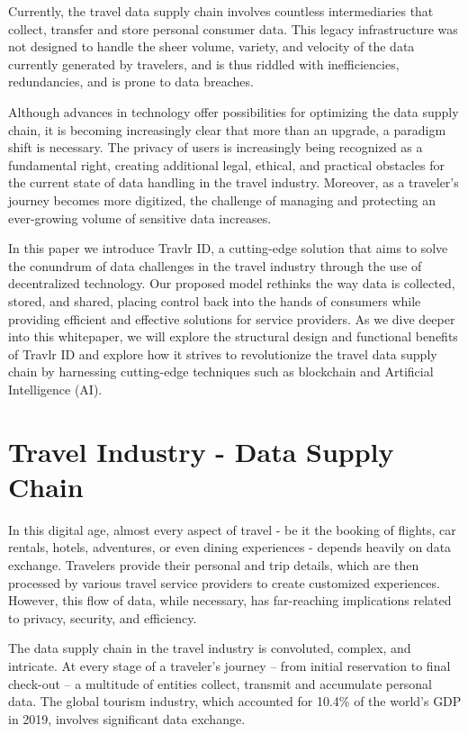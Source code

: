 \documentclass{article}
\begin{document}
Currently, the travel data supply chain involves countless intermediaries that collect, transfer and store personal consumer data. This legacy infrastructure was not designed to handle the sheer volume, variety, and velocity of the data currently generated by travelers, and is thus riddled with inefficiencies, redundancies, and is prone to data breaches.

Although advances in technology offer possibilities for optimizing the data supply chain, it is becoming increasingly clear that more than an upgrade, a paradigm shift is necessary. The privacy of users is increasingly being recognized as a fundamental right, creating additional legal, ethical, and practical obstacles for the current state of data handling in the travel industry. Moreover, as a traveler's journey becomes more digitized, the challenge of managing and protecting an ever-growing volume of sensitive data increases.

 In this paper we introduce Travlr ID, a cutting-edge solution that aims to solve the conundrum of data challenges in the travel industry through the use of decentralized technology. Our proposed model rethinks the way data is collected, stored, and shared, placing control back into the hands of consumers while providing efficient and effective solutions for service providers. As we dive deeper into this whitepaper, we will explore the structural design and functional benefits of Travlr ID and explore how it strives to revolutionize the travel data supply chain by harnessing cutting-edge techniques such as blockchain and Artificial Intelligence (AI).

\pagebreak

\section{Travel Industry - Data Supply Chain}

In this digital age, almost every aspect of travel - be it the booking of flights, car rentals, hotels, adventures, or even dining experiences - depends heavily on data exchange. Travelers provide their personal and trip details, which are then processed by various travel service providers to create customized experiences. However, this flow of data, while necessary, has far-reaching implications related to privacy, security, and efficiency.

The data supply chain in the travel industry is convoluted, complex, and intricate. At every stage of a traveler’s journey – from initial reservation to final check-out – a multitude of entities collect, transmit and accumulate personal data. The global tourism industry, which accounted for 10.4\% of the world's GDP in 2019, involves significant data exchange.
\end{document}
